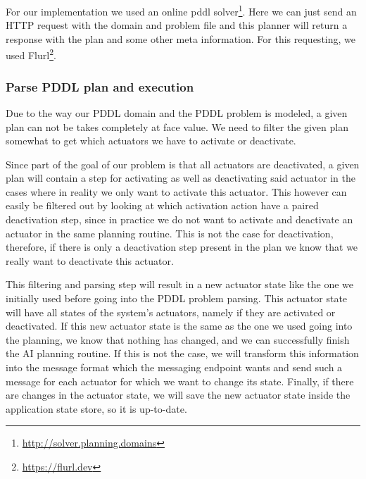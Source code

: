 For our implementation we used an online pddl solver\footnote{\url{http://solver.planning.domains}}.
Here we can just send an HTTP request with the domain and problem file and this planner will return a response with the plan and some other meta information.
For this requesting, we used Flurl\footnote{\url{https://flurl.dev}}.

\subsubsection{Parse PDDL plan and execution}\label{subsubsec:parse-pddl-plan-and-execution}
Due to the way our PDDL domain and the PDDL problem is modeled, a given plan can not be takes completely at face value.
We need to filter the given plan somewhat to get which actuators we have to activate or deactivate.

Since part of the goal of our problem is that all actuators are deactivated, a given plan will contain a step for activating as well as deactivating said actuator in the cases where in reality we only want to activate this actuator.
This however can easily be filtered out by looking at which activation action have a paired deactivation step, since in practice we do not want to activate and deactivate an actuator in the same planning routine.
This is not the case for deactivation, therefore, if there is only a deactivation step present in the plan we know that we really want to deactivate this actuator.

This filtering and parsing step will result in a new actuator state like the one we initially used before going into the PDDL problem parsing.
This actuator state will have all states of the system's actuators, namely if they are activated or deactivated.
If this new actuator state is the same as the one we used going into the planning, we know that nothing has changed, and we can successfully finish the AI planning routine.
If this is not the case, we will transform this information into the message format which the messaging endpoint wants and send such a message for each actuator for which we want to change its state.
Finally, if there are changes in the actuator state, we will save the new actuator state inside the application state store, so it is up-to-date.
